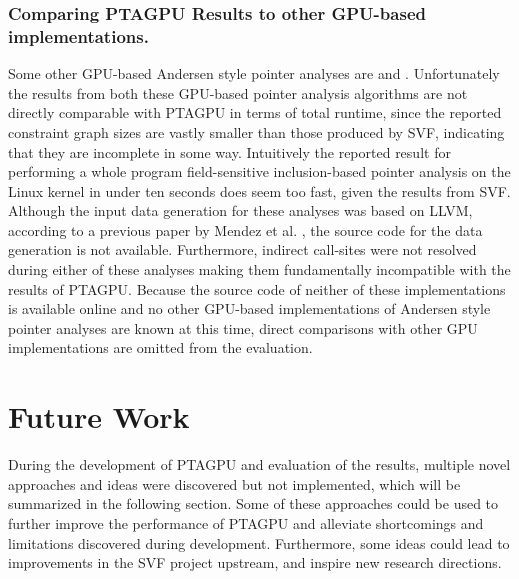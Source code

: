 \subsubsection{Comparing PTAGPU Results to other GPU-based implementations.}
Some other GPU-based Andersen style pointer analyses are \cite{mendez2012gpu} and \cite{su2015efficient}.
Unfortunately the results from both these GPU-based pointer analysis algorithms are not directly comparable with PTAGPU in terms of total runtime, since the reported constraint graph sizes are vastly smaller than those produced by SVF, indicating that they are incomplete in some way. Intuitively the reported result for performing a whole program field-sensitive inclusion-based pointer analysis on the Linux kernel in under ten seconds \cite{su2015efficient} does seem too fast, given the results from SVF.
Although the input data generation for these analyses was based on LLVM, according to a previous paper by Mendez et al. \cite{mendez2010parallel}, the source code for the data generation is not available.
Furthermore, indirect call-sites were not resolved during either of these analyses making them fundamentally incompatible with the results of PTAGPU.
Because the source code of neither of these implementations is available online and no other GPU-based implementations of Andersen style pointer analyses are known at this time, direct comparisons with other GPU implementations are omitted from the evaluation.

\section{Future Work}
During the development of PTAGPU and evaluation of the results, multiple novel approaches and ideas were discovered but not implemented, which will be summarized in the following section.
Some of these approaches could be used to further improve the performance of PTAGPU and alleviate shortcomings and limitations discovered during development.
Furthermore, some ideas could lead to improvements in the SVF project upstream, and inspire new research directions.

